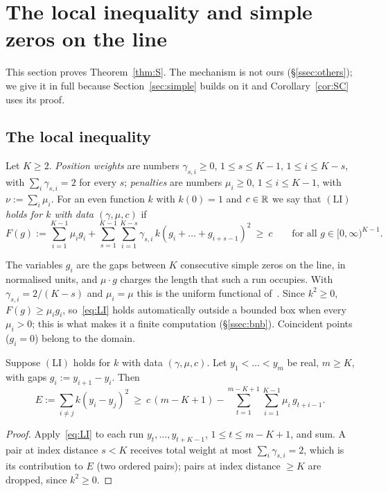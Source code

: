 \section{The local inequality and simple zeros on the line}\label{sec:first}

This section proves Theorem~\ref{thm:S}. The mechanism is not ours (\S\ref{ssec:others}); we give it in full because
Section~\ref{sec:simple} builds on it and Corollary~\ref{cor:SC} uses its proof.

\subsection{The local inequality}
\begin{definition}\label{def:LI}
Let $K\ge2$. \emph{Position weights} are numbers $\gamma_{s,i}\ge0$, $1\le s\le K-1$, $1\le i\le K-s$, with $\sum_i\gamma_{s,i}=2$ for every
$s$; \emph{penalties} are numbers $\mu_i\ge0$, $1\le i\le K-1$, with $\nu:=\sum_i\mu_i$. For an even function $k$ with $k(0)=1$ and
$c\in\mathbb R$ we say that $(\mathrm{LI})$ \emph{holds for $k$ with data $(\gamma,\mu,c)$} if
\begin{equation}\label{eq:LI}
F(g):=\sum_{i=1}^{K-1}\mu_ig_i+\sum_{s=1}^{K-1}\sum_{i=1}^{K-s}\gamma_{s,i}\,k(g_i+\dots+g_{i+s-1})^2\ \ge\ c\qquad\text{for all }g\in[0,\infty)^{K-1}.
\end{equation}
\end{definition}

The variables $g_i$ are the gaps between $K$ consecutive simple zeros on the line, in normalised units, and $\mu\cdot g$ charges the length that
such a run occupies. With $\gamma_{s,i}=2/(K-s)$ and $\mu_i=\mu$ this is the uniform functional of~\cite{ainta}. Since $k^2\ge0$, $F(g)\ge\mu_ig_i$,
so~\eqref{eq:LI} holds automatically outside a bounded box when every $\mu_i>0$; this is what makes it a finite computation (\S\ref{ssec:bnb}).
Coincident points ($g_i=0$) belong to the domain.

\begin{lemma}\label{lem:local}
Suppose $(\mathrm{LI})$ holds for $k$ with data $(\gamma,\mu,c)$. Let $y_1<\dots<y_m$ be real, $m\ge K$, with gaps $g_i:=y_{i+1}-y_i$. Then
\[
E:=\sum_{i\ne j}k(y_i-y_j)^2\ \ge\ c\,(m-K+1)-\sum_{t=1}^{m-K+1}\sum_{i=1}^{K-1}\mu_i\,g_{t+i-1}.
\]
\end{lemma}

\begin{proof}
Apply~\eqref{eq:LI} to each run $y_t,\dots,y_{t+K-1}$, $1\le t\le m-K+1$, and sum. A pair at index distance $s<K$ receives total weight at most
$\sum_i\gamma_{s,i}=2$, which is its contribution to $E$ (two ordered pairs); pairs at index distance $\ge K$ are dropped, since $k^2\ge0$.
\end{proof}

